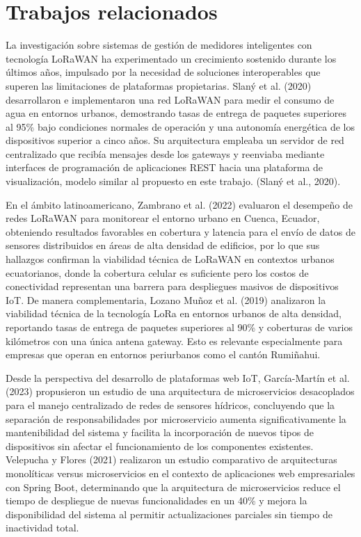 \documentclass[12pt,a4paper,oneside]{report}
\begin{document}
\section{Trabajos relacionados}\label{trabajos-relacionados}

La investigación sobre sistemas de gestión de medidores inteligentes con tecnología LoRaWAN ha experimentado un crecimiento sostenido durante los últimos años, impulsado por la necesidad de soluciones interoperables que superen las limitaciones de plataformas propietarias. Slaný et al. (2020) desarrollaron e implementaron una red LoRaWAN para medir el consumo de agua en entornos urbanos, demostrando tasas de entrega de paquetes superiores al 95\% bajo condiciones normales de operación y una autonomía energética de los dispositivos superior a cinco años. Su arquitectura empleaba un servidor de red centralizado que recibía mensajes desde los gateways y reenviaba mediante interfaces de programación de aplicaciones REST hacia una plataforma de visualización, modelo similar al propuesto en este trabajo. (Slaný et al., 2020).

En el ámbito latinoamericano, Zambrano et al. (2022) evaluaron el desempeño de redes LoRaWAN para monitorear el entorno urbano en Cuenca, Ecuador, obteniendo resultados favorables en cobertura y latencia para el envío de datos de sensores distribuidos en áreas de alta densidad de edificios, por lo que sus hallazgos confirman la viabilidad técnica de LoRaWAN en contextos urbanos ecuatorianos, donde la cobertura celular es suficiente pero los costos de conectividad representan una barrera para despliegues masivos de dispositivos IoT. De manera complementaria, Lozano Muñoz et al. (2019) analizaron la viabilidad técnica de la tecnología LoRa en entornos urbanos de alta densidad, reportando tasas de entrega de paquetes superiores al 90\% y coberturas de varios kilómetros con una única antena gateway. Esto es relevante especialmente para empresas que operan en entornos periurbanos como el cantón Rumiñahui.

Desde la perspectiva del desarrollo de plataformas web IoT, García-Martín et al. (2023) propusieron un estudio de una arquitectura de microservicios desacoplados para el manejo centralizado de redes de sensores hídricos, concluyendo que la separación de responsabilidades por microservicio aumenta significativamente la mantenibilidad del sistema y facilita la incorporación de nuevos tipos de dispositivos sin afectar el funcionamiento de los componentes existentes. Velepucha y Flores (2021) realizaron un estudio comparativo de arquitecturas monolíticas versus microservicios en el contexto de aplicaciones web empresariales con Spring Boot, determinando que la arquitectura de microservicios reduce el tiempo de despliegue de nuevas funcionalidades en un 40\% y mejora la disponibilidad del sistema al permitir actualizaciones parciales sin tiempo de inactividad total.
\end{document}

